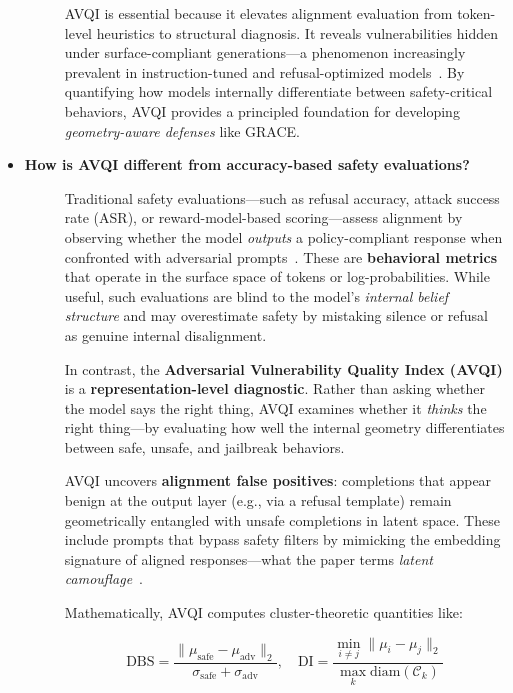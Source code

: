 \begin{itemize}[leftmargin=15pt,nolistsep]
\begin{description}
AVQI is essential because it elevates alignment evaluation from token-level heuristics to structural diagnosis. It reveals vulnerabilities hidden under surface-compliant generations—a phenomenon increasingly prevalent in instruction-tuned and refusal-optimized models~\citep{turpin2023llms, zhu2024promptbench}. By quantifying how models internally differentiate between safety-critical behaviors, AVQI provides a principled foundation for developing \textit{geometry-aware defenses} like GRACE.

\end{description}

\item[\ding{93}] { \selectfont \textbf{How is AVQI different from accuracy-based safety evaluations?}}

\begin{description}
\item[] Traditional safety evaluations—such as refusal accuracy, attack success rate (ASR), or reward-model-based scoring—assess alignment by observing whether the model \textit{outputs} a policy-compliant response when confronted with adversarial prompts~\citep{openai2023gpt4, bai2022training}. These are \textbf{behavioral metrics} that operate in the surface space of tokens or log-probabilities. While useful, such evaluations are blind to the model's \textit{internal belief structure} and may overestimate safety by mistaking silence or refusal as genuine internal disalignment.

In contrast, the \textbf{Adversarial Vulnerability Quality Index (AVQI)} is a \textbf{representation-level diagnostic}. Rather than asking whether the model says the right thing, AVQI examines whether it \textit{thinks} the right thing—by evaluating how well the internal geometry differentiates between safe, unsafe, and jailbreak behaviors.

AVQI uncovers \textbf{alignment false positives}: completions that appear benign at the output layer (e.g., via a refusal template) remain geometrically entangled with unsafe completions in latent space. These include prompts that bypass safety filters by mimicking the embedding signature of aligned responses—what the paper terms \emph{latent camouflage}~\citep{turpin2023llms}.

Mathematically, AVQI computes cluster-theoretic quantities like:

\[
\mathrm{DBS} = \frac{\|\mu_{\text{safe}} - \mu_{\text{adv}}\|_2}{\sigma_{\text{safe}} + \sigma_{\text{adv}}}, \quad 
\mathrm{DI} = \frac{\min_{i \neq j} \|\mu_i - \mu_j\|_2}{\max_k \mathrm{diam}(\mathcal{C}_k)}
\]


\end{description}
\end{itemize}
